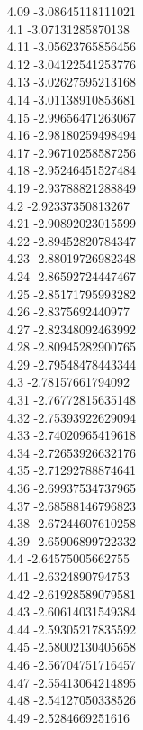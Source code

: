 {4.09	-3.08645118111021\\
4.1	-3.07131285870138\\
4.11	-3.05623765856456\\
4.12	-3.04122541253776\\
4.13	-3.02627595213168\\
4.14	-3.01138910853681\\
4.15	-2.99656471263067\\
4.16	-2.98180259498494\\
4.17	-2.96710258587256\\
4.18	-2.95246451527484\\
4.19	-2.93788821288849\\
4.2	-2.92337350813267\\
4.21	-2.90892023015599\\
4.22	-2.89452820784347\\
4.23	-2.88019726982348\\
4.24	-2.86592724447467\\
4.25	-2.85171795993282\\
4.26	-2.8375692440977\\
4.27	-2.82348092463992\\
4.28	-2.80945282900765\\
4.29	-2.79548478443344\\
4.3	-2.78157661794092\\
4.31	-2.76772815635148\\
4.32	-2.75393922629094\\
4.33	-2.74020965419618\\
4.34	-2.72653926632176\\
4.35	-2.71292788874641\\
4.36	-2.69937534737965\\
4.37	-2.68588146796823\\
4.38	-2.67244607610258\\
4.39	-2.65906899722332\\
4.4	-2.64575005662755\\
4.41	-2.6324890794753\\
4.42	-2.61928589079581\\
4.43	-2.60614031549384\\
4.44	-2.59305217835592\\
4.45	-2.58002130405658\\
4.46	-2.56704751716457\\
4.47	-2.55413064214895\\
4.48	-2.54127050338526\\
4.49	-2.5284669251616\\
}
